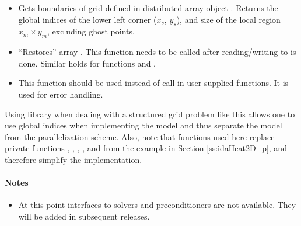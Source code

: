 \begin{itemize}
\item {}
  \par Gets boundaries of grid defined in distributed array object .
  Returns the global indices of the lower left corner ($x_s$, $y_s$), 
  and size of the local region $x_m \times y_m$, excluding ghost points. 
  
\item {}
  \par ``Restores'' array . This function needs to be called after 
  reading/writing to  is done. Similar holds for functions 
   and .
  
\item {}
  \par This function should be used instead of  call in user
  supplied {\petsc} functions. It is used for error handling.
  
\end{itemize}

Using {\petsc} library when dealing with a structured grid problem like this 
allows one to use global indices when implementing the model and thus 
separate the model from the parallelization scheme. Also, note that {\petsc} 
functions used here replace private functions , , 
, ,  and  from the 
 example in Section \ref{ss:idaHeat2D_p}, and 
therefore simplify the implementation.


\paragraph{\bf Notes} 
           
\begin{itemize}
                                        
\item
  {\warn}At this point interfaces to {\petsc} solvers and preconditioners are 
  not available. They will be added in subsequent {\sundials} releases. 

\end{itemize}




